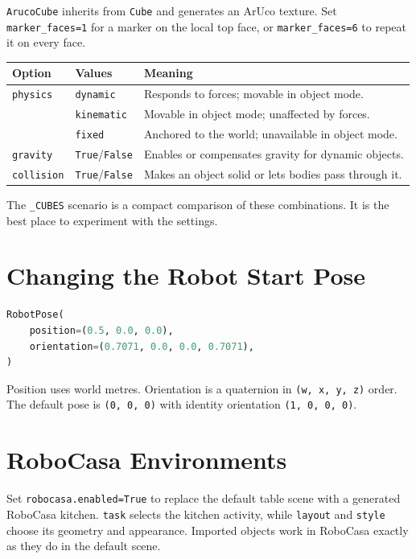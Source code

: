 \documentclass[11pt,a4paper]{article}
\begin{document}
\texttt{ArucoCube} inherits from \texttt{Cube} and generates an ArUco texture.
Set \texttt{marker\_faces=1} for a marker on the local top face, or
\texttt{marker\_faces=6} to repeat it on every face.

\begin{center}
\begin{tabular}{lll}
\toprule
\textbf{Option} & \textbf{Values} & \textbf{Meaning} \\
\midrule
\texttt{physics} & \texttt{dynamic} & Responds to forces; movable in object mode. \\
& \texttt{kinematic} & Movable in object mode; unaffected by forces. \\
& \texttt{fixed} & Anchored to the world; unavailable in object mode. \\
\texttt{gravity} & \texttt{True}/\texttt{False} & Enables or compensates gravity for dynamic objects. \\
\texttt{collision} & \texttt{True}/\texttt{False} & Makes an object solid or lets bodies pass through it. \\
\bottomrule
\end{tabular}
\end{center}

The \texttt{\_CUBES} scenario is a compact comparison of these combinations.
It is the best place to experiment with the settings.

\section{Changing the Robot Start Pose}

\begin{lstlisting}[language=Python]
RobotPose(
    position=(0.5, 0.0, 0.0),
    orientation=(0.7071, 0.0, 0.0, 0.7071),
)
\end{lstlisting}

Position uses world metres. Orientation is a quaternion in \texttt{(w, x, y, z)}
order. The default pose is \texttt{(0, 0, 0)} with identity orientation
\texttt{(1, 0, 0, 0)}.

\section{RoboCasa Environments}

Set \texttt{robocasa.enabled=True} to replace the default table scene with a
generated RoboCasa kitchen. \texttt{task} selects the kitchen activity, while
\texttt{layout} and \texttt{style} choose its geometry and appearance. Imported
objects work in RoboCasa exactly as they do in the default scene.
\end{document}
